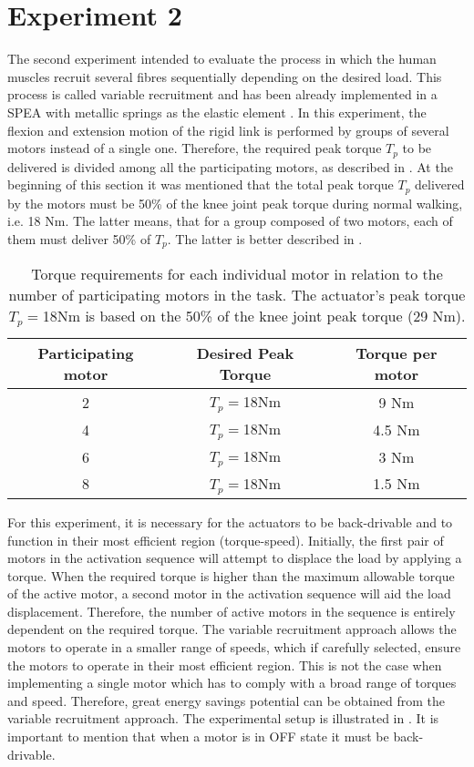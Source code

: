 \section{Experiment 2}

The second experiment intended to evaluate the process in which the human muscles recruit several fibres sequentially depending on the desired load. This process is called variable recruitment and has been already implemented in a SPEA with metallic springs as the elastic element \cite{mathijssen2014variable}. In this experiment, the flexion and extension motion of the rigid link is performed by groups of several motors instead of a single one. Therefore, the required peak torque $T_p$  to be delivered is divided among all the participating motors, as described in . At the beginning of this section it was mentioned that the total peak torque $T_p$   delivered by the motors must be 50\% of the knee joint peak torque during normal walking, i.e. 18 Nm. The latter means, that for a group composed of two motors, each of them must deliver 50\% of $T_p$. The latter is better described in .

\begin{table}[hbt!]
    \centering
    \begin{tabular}{ccc}
    \toprule
    Participating motor & Desired Peak Torque   & Torque per motor\\
    \hline
        2   &  $T_p=$18Nm   & 9 Nm\\
        4   &  $T_p=$18Nm   & 4.5 Nm\\
        6   &  $T_p=$18Nm   & 3 Nm\\
        8   &  $T_p=$18Nm   & 1.5 Nm\\
    \bottomrule
    \end{tabular}
    \caption{Torque requirements for each individual motor in relation to the number of participating motors in the task. The actuator's peak torque $T_p=$18Nm is based on the 50\% of the knee joint peak torque (29 Nm).}
    \label{tab:table1}
\end{table}

For this experiment, it is necessary for the actuators to be back-drivable and to function in their most efficient region (torque-speed). Initially, the first pair of motors in the activation sequence will attempt to displace the load by applying a torque. When the required torque is higher than the maximum allowable torque of the active motor, a second motor in the activation sequence will aid the load displacement. Therefore, the number of active motors in the sequence is entirely dependent on the required torque. The variable recruitment approach allows the motors to operate in a smaller range of speeds, which if carefully selected, ensure the motors to operate in their most efficient region. This is not the case when implementing a single motor which has to comply with a broad range of torques and speed. Therefore, great energy savings potential can be obtained from the variable recruitment approach. The experimental setup is illustrated in . It is important to mention that when a motor is in OFF state it must be back-drivable.

